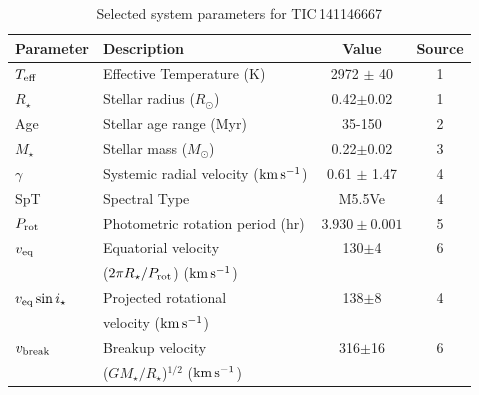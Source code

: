 \documentclass[11pt,twocolumn,tighten,linenumbers]{aastex7}
\newcommand{\kms}{\ensuremath{\rm km\,s^{-1}}}
\begin{document}
\begin{table}
\small
\setlength{\tabcolsep}{2pt}
\centering
\caption{Selected system parameters for TIC\,141146667}
\label{tab:params}
\begin{tabular}{llcc}
\hline \hline
Parameter & Description & Value & Source\\
\hline 
%
$T_{\rm eff}$\dotfill                   & Effective Temperature (K) \hspace{9pt}\dotfill                 & 2972 $\pm$ 40    & 1 \\
%
$R_\star$\dotfill                       & Stellar radius ($R_\odot$)\dotfill                             & 0.42$\pm$0.02    & 1 \\
%
Age                                     & Stellar age range (Myr)\dotfill                                & 35-150           & 2 \\
%
$M_\star$\dotfill                       & Stellar mass ($M_\odot$)\dotfill                               & 0.22$\pm$0.02    & 3 \\
%
$\gamma$\dotfill                        & Systemic radial velocity (\kms)\dotfill                        & 0.61 $\pm$ 1.47  & 4 \\
%
SpT\dotfill                             & Spectral Type\dotfill                                          & M5.5Ve           & 4 \\
%
$P_{\rm rot}$\dotfill                   & Photometric rotation period (hr)\dotfill                       & $3.930\pm 0.001$ & 5 \\
%
$v_{\rm eq}$\dotfill		                & Equatorial velocity \dotfill                                   &  130$\pm$4       & 6 \\
                                        & \hspace{3pt} ($2\pi R_\star/P_{\rm rot}$) (\kms)	             &                      \\
%
$v_{\rm eq}\sin{i_\star}$\dotfill		    & Projected rotational\dotfill                                   &  138$\pm$8       & 4 \\
                                        & \hspace{3pt} velocity (\kms)	                                 &                      \\
%
$v_{\rm break}$\dotfill		              & Breakup velocity \dotfill                                      &  316$\pm$16      & 6 \\
                                        & \hspace{3pt} ($G M_\star / R_\star$)$^{1/2}$ (\kms)	           &                      \\

\end{tabular}
\end{table}
\end{document}
